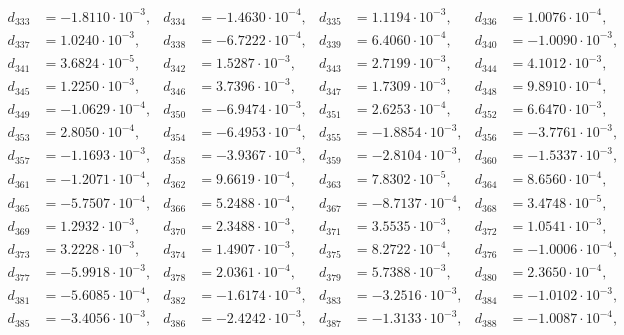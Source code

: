 \begin{align*}
d_{ 333 } &= -1.8110 \cdot 10^{ -3 }, & d_{ 334 } &= -1.4630 \cdot 10^{ -4 }, & d_{ 335 } &= 1.1194 \cdot 10^{ -3 }, & d_{ 336 } &= 1.0076 \cdot 10^{ -4 },\\ 
d_{ 337 } &= 1.0240 \cdot 10^{ -3 }, & d_{ 338 } &= -6.7222 \cdot 10^{ -4 }, & d_{ 339 } &= 6.4060 \cdot 10^{ -4 }, & d_{ 340 } &= -1.0090 \cdot 10^{ -3 },\\ 
d_{ 341 } &= 3.6824 \cdot 10^{ -5 }, & d_{ 342 } &= 1.5287 \cdot 10^{ -3 }, & d_{ 343 } &= 2.7199 \cdot 10^{ -3 }, & d_{ 344 } &= 4.1012 \cdot 10^{ -3 },\\ 
d_{ 345 } &= 1.2250 \cdot 10^{ -3 }, & d_{ 346 } &= 3.7396 \cdot 10^{ -3 }, & d_{ 347 } &= 1.7309 \cdot 10^{ -3 }, & d_{ 348 } &= 9.8910 \cdot 10^{ -4 },\\ 
d_{ 349 } &= -1.0629 \cdot 10^{ -4 }, & d_{ 350 } &= -6.9474 \cdot 10^{ -3 }, & d_{ 351 } &= 2.6253 \cdot 10^{ -4 }, & d_{ 352 } &= 6.6470 \cdot 10^{ -3 },\\ 
d_{ 353 } &= 2.8050 \cdot 10^{ -4 }, & d_{ 354 } &= -6.4953 \cdot 10^{ -4 }, & d_{ 355 } &= -1.8854 \cdot 10^{ -3 }, & d_{ 356 } &= -3.7761 \cdot 10^{ -3 },\\ 
d_{ 357 } &= -1.1693 \cdot 10^{ -3 }, & d_{ 358 } &= -3.9367 \cdot 10^{ -3 }, & d_{ 359 } &= -2.8104 \cdot 10^{ -3 }, & d_{ 360 } &= -1.5337 \cdot 10^{ -3 },\\ 
d_{ 361 } &= -1.2071 \cdot 10^{ -4 }, & d_{ 362 } &= 9.6619 \cdot 10^{ -4 }, & d_{ 363 } &= 7.8302 \cdot 10^{ -5 }, & d_{ 364 } &= 8.6560 \cdot 10^{ -4 },\\ 
d_{ 365 } &= -5.7507 \cdot 10^{ -4 }, & d_{ 366 } &= 5.2488 \cdot 10^{ -4 }, & d_{ 367 } &= -8.7137 \cdot 10^{ -4 }, & d_{ 368 } &= 3.4748 \cdot 10^{ -5 },\\ 
d_{ 369 } &= 1.2932 \cdot 10^{ -3 }, & d_{ 370 } &= 2.3488 \cdot 10^{ -3 }, & d_{ 371 } &= 3.5535 \cdot 10^{ -3 }, & d_{ 372 } &= 1.0541 \cdot 10^{ -3 },\\ 
d_{ 373 } &= 3.2228 \cdot 10^{ -3 }, & d_{ 374 } &= 1.4907 \cdot 10^{ -3 }, & d_{ 375 } &= 8.2722 \cdot 10^{ -4 }, & d_{ 376 } &= -1.0006 \cdot 10^{ -4 },\\ 
d_{ 377 } &= -5.9918 \cdot 10^{ -3 }, & d_{ 378 } &= 2.0361 \cdot 10^{ -4 }, & d_{ 379 } &= 5.7388 \cdot 10^{ -3 }, & d_{ 380 } &= 2.3650 \cdot 10^{ -4 },\\ 
d_{ 381 } &= -5.6085 \cdot 10^{ -4 }, & d_{ 382 } &= -1.6174 \cdot 10^{ -3 }, & d_{ 383 } &= -3.2516 \cdot 10^{ -3 }, & d_{ 384 } &= -1.0102 \cdot 10^{ -3 },\\ 
d_{ 385 } &= -3.4056 \cdot 10^{ -3 }, & d_{ 386 } &= -2.4242 \cdot 10^{ -3 }, & d_{ 387 } &= -1.3133 \cdot 10^{ -3 }, & d_{ 388 } &= -1.0087 \cdot 10^{ -4 },\\ 

\end{align*}
